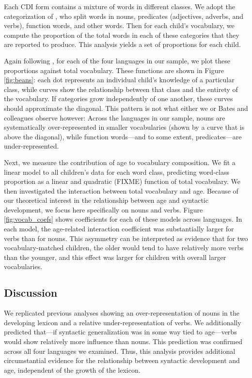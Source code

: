 \documentclass[10pt,letterpaper]{article}
\begin{document}
Each CDI form contains a mixture of words in different classes. We adopt the categorization of , who split words in nouns, predicates (adjectives, adverbs, and verbs), function words, and other words. Then for each child's vocabulary, we compute the proportion of the total words in each of these categories that they are reported to produce. This analysis yields a set of proportions for each child.

Again following , for each of the four languages in our sample, we plot these proportions against total vocabulary. These functions are shown in Figure \ref{fig:beans}: each dot represents an individual child's knowledge of a particular class, while curves show the relationship between that class and the entirety of the vocabulary. If categories grow independently of one another, these curves should approximate the diagonal. This pattern is not what either we or Bates and colleagues observe however: Across the languages in our sample, nouns are systematically over-represented in smaller vocabularies (shown by a curve that is above the diagonal), while function words---and to some extent, predicates---are under-represented. 

Next, we measure the contribution of age to vocabulary composition. We fit a linear model to all children's data for each word class, predicting word-class proportion as a linear and quadratic (FIXME) function of total vocabulary. We then investigated the interaction between total vocabulary and age. Because of our theoretical interest in the relationship between age and syntactic development, we focus here specifically on nouns and verbs. Figure \ref{fig:vocab_coefs} shows coefficients for each of these models across languages. In each model, the age-related interaction coefficient was substantially larger for verbs than for nouns. This asymmetry can be interpreted as evidence that for two vocabulary-matched children, the older would tend to have relatively more verbs than the younger, and this effect was larger for children with overall larger vocabularies.  

\subsection{Discussion}

We replicated previous analyses showing an over-representation of nouns in the developing lexicon and a relative under-representation of verbs. We additionally predicted that---if syntactic generalization was in some way tied to age---verbs would show relatively more influence than nouns. This prediction was confirmed across all four languages we examined. Thus, this analysis provides additional circumstantial evidence for the relationship between syntactic development and age, independent of the growth of the lexicon. 
\end{document}

